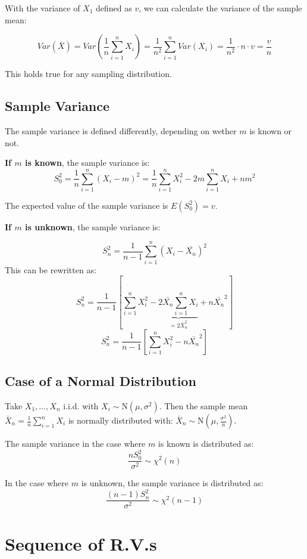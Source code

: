 With the variance of $X_1$ defined as $v$, we can calculate the variance of the sample mean:

\[
Var(\bar{X}) = Var\left(\frac{1}{n} \sum_{i=1}^{n} X_i\right) = \frac{1}{n^2} \sum_{i=1}^{n} Var(X_i) = \frac{1}{n^2} \cdot n \cdot v = \frac{v}{n}
\]

This holds true for any sampling distribution.

\subsection*{Sample Variance}

The sample variance is defined differently, depending on wether $m$ is known or not.

\textbf{If $m$ is known}, the sample variance is:
\[
S_0^2 = \frac{1}{n} \sum_{i=1}^{n} (X_i - m)^2 = \frac{1}{n} \sum_{i=1}^{n} X_i^2 - 2m \sum_{i=1}^{n} X_i + n m^2
\]

The expected value of the sample variance is $E(S_0^2) = v$.

\textbf{If $m$ is unknown}, the sample variance is:

\[
S_n^2 = \frac{1}{n-1} \sum_{i=1}^{n} (X_i - \bar{X_n})^2
\]
This can be rewritten as:
\[
S_n^2 = \frac{1}{n-1} \left[\sum_{i=1}^{n} X_i^2 - \underbrace{2\bar{X_n} \sum_{i=1}^{n} X_i}_{=2\bar{X}_n^2} + n \bar{X_n}^2\right]
\]
\[
S_n^2 = \frac{1}{n-1} \left[\sum_{i=1}^{n} X_i^2 - n \bar{X_n}^2\right]
\]

\subsection*{Case of a Normal Distribution}

Take $X_1, \ldots , X_n$ i.i.d. with $X_i \sim \text{N}(\mu, \sigma^2)$.
Then the sample mean $\bar{X}_n = \frac{1}{n} \sum_{i=1}^{n} X_i$ is normally distributed with:
$\bar{X}_n \sim \text{N}(\mu, \frac{\sigma^2}{n})$.

The sample variance in the case where $m$ is known is distributed as:
\[
\frac{n S_0^2}{\sigma^2} \sim \chi^2(n)
\]

In the case where $m$ is unknown, the sample variance is distributed as:
\[
\frac{(n-1) S_n^2}{\sigma^2} \sim \chi^2(n-1)
\]

\section{Sequence of R.V.s}


